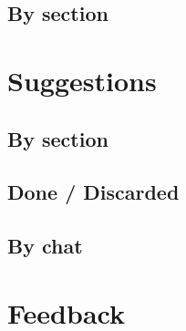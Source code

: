 \documentclass{article}
\begin{document}
\subsection{By section}


\section{Suggestions}


\subsection{By section}


\subsection{Done / Discarded}


\subsection{By chat}


\section{Feedback}

	
\end{document}
